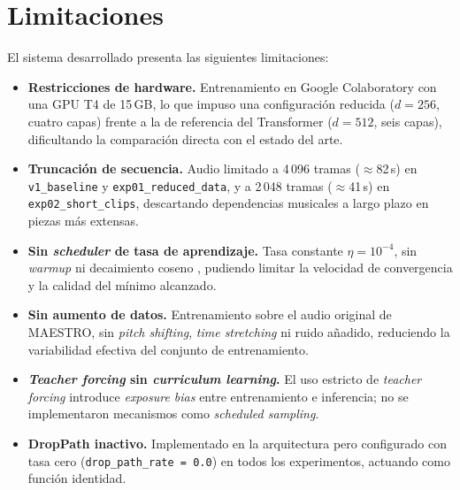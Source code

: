 \section{Limitaciones}
\label{sec:limitaciones}

El sistema desarrollado presenta las siguientes limitaciones:

\begin{itemize}
    \item \textbf{Restricciones de hardware.} Entrenamiento en Google
    Colaboratory con una GPU T4 de 15\,GB, lo que impuso una
    configuración reducida ($d=256$, cuatro capas) frente a la de
    referencia del Transformer ($d=512$, seis capas), dificultando la
    comparación directa con el estado del arte.

    \item \textbf{Truncación de secuencia.} Audio limitado a 4\,096
    tramas ($\approx$82\,s) en \texttt{v1\_baseline} y
    \texttt{exp01\_reduced\_data}, y a 2\,048 tramas ($\approx$41\,s)
    en \texttt{exp02\_short\_clips}, descartando dependencias
    musicales a largo plazo en piezas más extensas.

    \item \textbf{Sin \textit{scheduler} de tasa de aprendizaje.}
    Tasa constante $\eta=10^{-4}$, sin \textit{warmup} ni decaimiento
    coseno \cite{vaswani2017attention}, pudiendo limitar la velocidad
    de convergencia y la calidad del mínimo alcanzado.

    \item \textbf{Sin aumento de datos.} Entrenamiento sobre el audio
    original de MAESTRO, sin \textit{pitch shifting},
    \textit{time stretching} ni ruido añadido, reduciendo la
    variabilidad efectiva del conjunto de entrenamiento.

    \item \textbf{\textit{Teacher forcing} sin \textit{curriculum
    learning}.} El uso estricto de \textit{teacher forcing} introduce
    \textit{exposure bias} entre entrenamiento e inferencia; no se
    implementaron mecanismos como \textit{scheduled sampling}.

    \item \textbf{DropPath inactivo.} Implementado en la arquitectura
    pero configurado con tasa cero (\texttt{drop\_path\_rate = 0.0})
    en todos los experimentos, actuando como función identidad.


\end{itemize}
